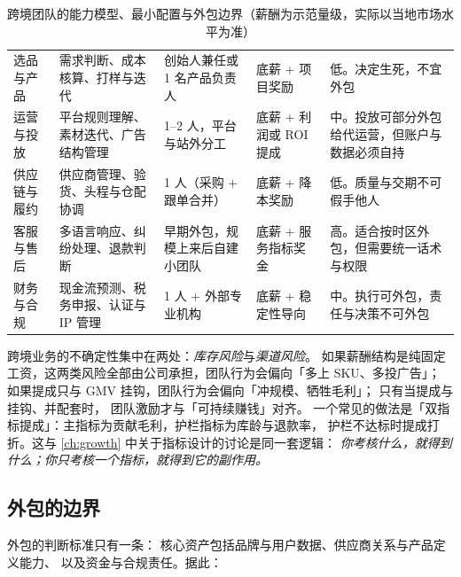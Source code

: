 \begin{table}[htbp]
\centering
\caption{跨境团队的能力模型、最小配置与外包边界（薪酬为示范量级，实际以当地市场水平为准）}
\label{tab:cbec-team}
\small
\begin{tabularx}{\textwidth}{L{2.0cm} L{2.4cm} L{2.4cm} L{2.6cm} Y}
\toprule
{} &  &  &  &  \\
\midrule
选品与产品 & 需求判断、成本核算、打样与迭代 & 创始人兼任或 1 名产品负责人 & 底薪 + 项目奖励 & 低。决定生死，不宜外包 \\
\addlinespace
运营与投放 & 平台规则理解、素材迭代、广告结构管理 & 1--2 人，平台与站外分工 & 底薪 + 利润或 ROI 提成 & 中。投放可部分外包给代运营，但账户与数据必须自持 \\
\addlinespace
供应链与履约 & 供应商管理、验货、头程与仓配协调 & 1 人（采购 + 跟单合并） & 底薪 + 降本奖励 & 低。质量与交期不可假手他人 \\
\addlinespace
客服与售后 & 多语言响应、纠纷处理、退款判断 & 早期外包，规模上来后自建小团队 & 底薪 + 服务指标奖金 & 高。适合按时区外包，但需要统一话术与权限 \\
\addlinespace
财务与合规 & 现金流预测、税务申报、认证与 IP 管理 & 1 人 + 外部专业机构 & 底薪 + 稳定性导向 & 中。执行可外包，责任与决策不可外包 \\
\bottomrule
\end{tabularx}
\end{table}

\begin{insight}[薪酬结构是风险分配的另一种写法]
跨境业务的不确定性集中在两处：\emph{库存风险}与\emph{渠道风险}。
如果薪酬结构是纯固定工资，这两类风险全部由公司承担，团队行为会偏向「多上 SKU、多投广告」；
如果提成只与 GMV 挂钩，团队行为会偏向「冲规模、牺牲毛利」；
只有当提成与挂钩、并配套时，
团队激励才与「可持续赚钱」对齐。
一个常见的做法是「双指标提成」：主指标为贡献毛利，护栏指标为库龄与退款率，
护栏不达标时提成打折。这与 \cref{ch:growth} 中关于指标设计的讨论是同一套逻辑：
\emph{你考核什么，就得到什么；你只考核一个指标，就得到它的副作用。}
\end{insight}

\subsection{外包的边界}

外包的判断标准只有一条：
核心资产包括品牌与用户数据、供应商关系与产品定义能力、
以及资金与合规责任。据此：

